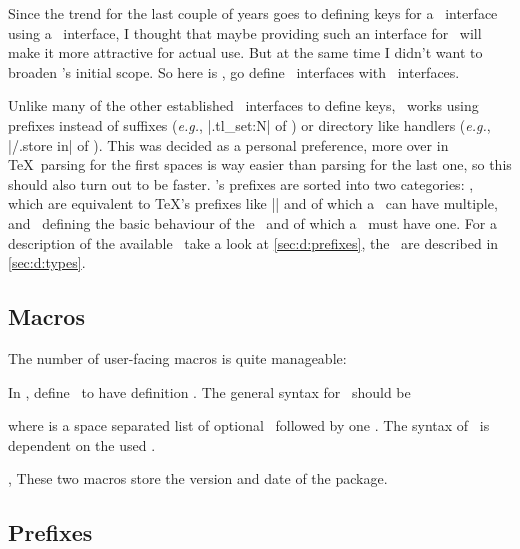 \genericekv{}

Since the trend for the last couple of years goes to defining keys for a \kv\
interface using a \kv\ interface, I thought that maybe providing such an
interface for \expkv\ will make it more attractive for actual use. But at the
same time I didn't want to broaden \expkv's initial scope. So here is \expkvd,
go define \kv\ interfaces with \kv\ interfaces.

Unlike many of the other established \kv\ interfaces to define keys, \expkvd\
works using prefixes instead of suffixes (\emph{e.g.}, |.tl_set:N| of
\pkg{l3keys}) or directory like handlers (\emph{e.g.}, |/.store in| of
\pkg{pgfkeys}). This was decided as a personal preference, more over in \TeX\
parsing for the first spaces is way easier than parsing for the last one, so
this should also turn out to be faster. \expkvd's prefixes are sorted into two
categories: \prefixes, which are equivalent to \TeX's prefixes like |\long| and
of which a \key\ can have multiple, and \types\ defining the basic behaviour of
the \key\ and of which a \key\ must have one. For a description of the available
\prefixes\ take a look at \autoref{sec:d:prefixes}, the \types\ are described in
\autoref{sec:d:types}.


\subsection{Macros\label{sec:d:macros}}

The number of user-facing macros is quite manageable:

\begin{function}{\ekvdefinekeys}
  \begin{syntax}
    \kvarg
  \end{syntax}
  In \meta{set}, define \key\ to have definition \val. The general syntax for
  \key\ should be
  \begin{quote}
    \ttfamily
     
  \end{quote}
  where  is a space separated list of optional \prefixes\ followed
  by one \type. The syntax of \val\ is dependent on the used \type.
\end{function}

\begin{function}{\ekvdDate,\ekvdVersion}
  These two macros store the version and date of the package.
\end{function}


\subsection{Prefixes}


